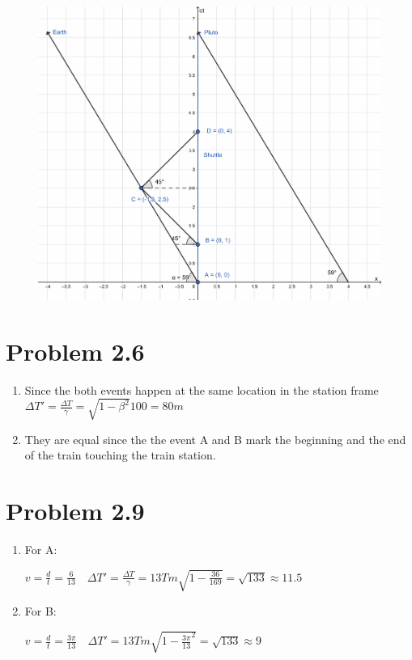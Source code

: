 \documentclass[12pt]{article}
\begin{document}
\begin{figure}[H]
    \centering
    \includegraphics[scale=0.4]{Q1D.png}
\end{figure}

\newpage

\section{Problem 2.6}

\begin{enumerate}
    \item Since the both events happen at the same location in the station frame \(\Delta T' = \frac{\Delta T}{\gamma} = \sqrt{1-\beta^2} 100 = 80m \)
    \item They are equal since the the event A and B mark the beginning and the end of the train touching the train station.
\end{enumerate}

\newpage

\section{Problem 2.9}

\begin{enumerate}
    \item For A:

          \(v=\frac{d}{t} = \frac{6}{13}\quad \Delta T' = \frac{\Delta T}{\gamma} = 13Tm\sqrt{1-\frac{36}{169}} = \sqrt{133} \approx 11.5 \)

    \item For B:

          \(v=\frac{d}{t} = \frac{3\pi}{13}\quad \Delta T' = 13Tm\sqrt{1-{\frac{3\pi}{13}}^2} = \sqrt{133} \approx 9 \)
\end{enumerate}
\end{document}

